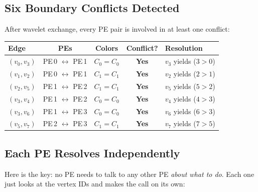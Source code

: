 \documentclass[11pt,letterpaper]{article}
\begin{document}
\subsection{Six Boundary Conflicts Detected}

After wavelet exchange, every PE pair is involved in at least one conflict:

\begin{center}
\renewcommand{\arraystretch}{1.2}
\begin{tabular}{lcccl}
\toprule
Edge & PEs & Colors & Conflict? & Resolution \\
\midrule
$(v_0,v_3)$ & PE\,0 $\leftrightarrow$ PE\,1 & $C_0 = C_0$ & \textcolor{conflictRed}{\textbf{Yes}} & $v_3$ yields ($3>0$) \\
$(v_1,v_2)$ & PE\,0 $\leftrightarrow$ PE\,1 & $C_1 = C_1$ & \textcolor{conflictRed}{\textbf{Yes}} & $v_2$ yields ($2>1$) \\
$(v_2,v_5)$ & PE\,1 $\leftrightarrow$ PE\,2 & $C_1 = C_1$ & \textcolor{conflictRed}{\textbf{Yes}} & $v_5$ yields ($5>2$) \\
$(v_3,v_4)$ & PE\,1 $\leftrightarrow$ PE\,2 & $C_0 = C_0$ & \textcolor{conflictRed}{\textbf{Yes}} & $v_4$ yields ($4>3$) \\
$(v_3,v_6)$ & PE\,1 $\leftrightarrow$ PE\,3 & $C_0 = C_0$ & \textcolor{conflictRed}{\textbf{Yes}} & $v_6$ yields ($6>3$) \\
$(v_5,v_7)$ & PE\,2 $\leftrightarrow$ PE\,3 & $C_1 = C_1$ & \textcolor{conflictRed}{\textbf{Yes}} & $v_7$ yields ($7>5$) \\
\bottomrule
\end{tabular}
\end{center}

\subsection{Each PE Resolves Independently}

Here is the key: no PE needs to talk to any other PE \emph{about what to do}. Each one just looks at the vertex IDs and makes the call on its own:
\end{document}
